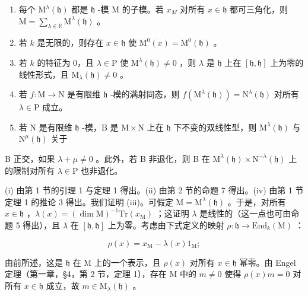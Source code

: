 \begin{enumerate}
\def\labelenumi{(\roman{enumi})}
\item
  每个 \(\mathrm{M}^{\lambda}(\mathfrak{h})\) 都是 \(\mathfrak{h}\) -模 \(\mathrm{M}\) 的子模。若 \(x_{M}\) 对所有 \(x\in \mathfrak{h}\) 都可三角化，则 \(\mathrm{M} = \sum_{\lambda \in \mathbb{R}}\mathrm{M}^{\lambda}(\mathfrak{h})\) 。
\item
  若 \(k\) 是无限的，则存在 \(x \in \mathfrak{h}\) 使 \(\mathrm{M}^0(x) = \mathrm{M}^0(\mathfrak{h})\) 。
\item
  若 \(k\) 的特征为 0，且 \(\lambda \in \mathrm{P}\) 使 \(\mathrm{M}^{\lambda}(\mathfrak{h}) \neq 0\) ，则 \(\lambda\) 是 \(\mathfrak{h}\) 上在 \([\mathfrak{h},\mathfrak{h}]\) 上为零的线性形式，且 \(\mathrm{M}_{\lambda}(\mathfrak{h}) \neq 0\) 。
\item
  若 \(f: \mathrm{M} \to \mathrm{N}\) 是有限维 \(\mathfrak{h}\) -模的满射同态，则 \(f(\mathrm{M}^{\lambda}(\mathfrak{h})) = \mathrm{N}^{\lambda}(\mathfrak{h})\) 对所有 \(\lambda \in \mathrm{P}\) 成立。
\item
  若 \(\mathrm{N}\) 是有限维 \(\mathfrak{h}\) -模，\(\mathrm{B}\) 是 \(\mathrm{M} \times \mathrm{N}\) 上在 \(\mathfrak{h}\) 下不变的双线性型，则 \(\mathrm{M}^{\lambda}(\mathfrak{h})\) 与 \(\mathrm{N}^{\mu}(\mathfrak{h})\) 关于
\end{enumerate}

B 正交，如果 \(\lambda + \mu \neq 0\) 。此外，若 B 非退化，则 B 在 \(\mathrm{M}^{\lambda}(\mathfrak{h}) \times \mathrm{N}^{-\lambda}(\mathfrak{h})\) 上的限制对所有 \(\lambda \in \mathrm{P}\) 也非退化。

(i) 由第 1 节的引理 1 与定理 1 得出。(ii) 由第 2 节的命题 7 得出。(iv) 由第 1 节定理 1 的推论 3 得出。我们证明 (iii)。可假定 \(\mathrm{M} = \mathrm{M}^{\lambda}(\mathfrak{h})\) 。于是，对所有 \(x \in \mathfrak{h}\) ，\(\lambda(x) = (\dim \mathrm{M})^{-1}\mathrm{Tr}(x_{\mathrm{M}})\) ；这证明 \(\lambda\) 是线性的（这一点也可由命题 5 得出），且 \(\lambda\) 在 \([\mathfrak{h},\mathfrak{h}]\) 上为零。考虑由下式定义的映射 \(\rho : \mathfrak{h} \to \mathrm{End}_k(\mathrm{M})\) ：

\[
\rho (x) = x _ {\mathrm{M}} - \lambda (x) 1 _ {\mathrm{M}};
\]

由前所述，这是 \(\mathfrak{h}\) 在 M 上的一个表示，且 \(\rho(x)\) 对所有 \(x \in \mathfrak{h}\) 幂零。由 Engel 定理（第一章，§4，第 2 节，定理 1），存在 M 中的 \(m \neq 0\) 使得 \(\rho(x)m = 0\) 对所有 \(x \in \mathfrak{h}\) 成立，故 \(m \in \mathrm{M}_{\lambda}(\mathfrak{h})\) 。

